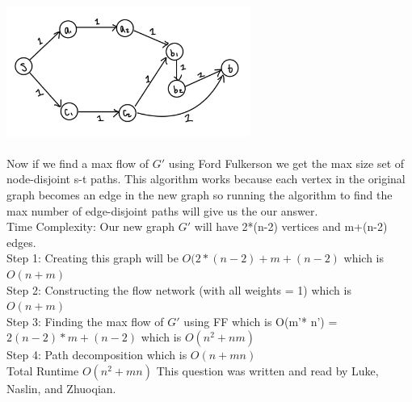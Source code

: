 \documentclass[12pt]{article}
\begin{document}
    \includegraphics[width=8cm]{Graphs/3B.jpg}
    \\\\
    Now if we find a max flow of $G'$ using Ford Fulkerson we get the max size set of node-disjoint s-t paths. 
    This algorithm works because each vertex in the original graph becomes an edge in the new graph so running the algorithm to find the max number of edge-disjoint paths will give us the our answer.
    \\
    Time Complexity: Our new graph $G'$ will have 2*(n-2) vertices and m+(n-2) edges. \\ Step 1: Creating this graph will be $O(2*(n-2) + m+(n-2)$ which is $O(n + m)$ \\
    Step 2: Constructing the flow network (with all weights = 1) which is $O(n + m)$\\
    Step 3: Finding the max flow of $G'$ using FF which is O(m'* n') = $2(n-2) * m+(n-2)$ which is $O(n^2 + nm)$\\
    Step 4: Path decomposition which is $O(n + mn)$\\
    \newline Total Runtime $O(n^2 + mn)$
    \newline This question was written and read by  Luke, Naslin, and Zhuoqian.
\end{document}
